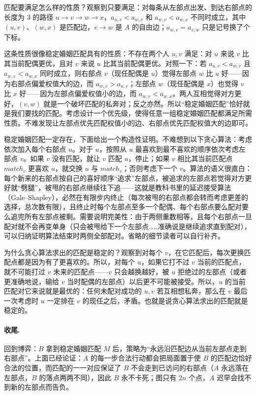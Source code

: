 匹配要满足怎么样的性质？观察到只要满足：对每条从左部点出发、到达右部点的长度为 $3$ 的路径 $u\to v\to w\to x$，$a_{u,v}<a_{w,v}$ 和 $a_{w,v}<a_{w,x}$ 不同时成立，其中 $(u,v)$、$(w,x)$ 是匹配边，$v\to w$ 是 $A$ 的自由边；$a_{w,v}=a_{v,w}$ 只是记号换了个下标。

这条性质很像稳定婚姻匹配具有的性质：不存在两个人 $u,v$ 满足：对 $u$ 来说 $v$ 比其当前配偶更优，且对 $v$ 来说 $u$ 比其当前配偶更优。对照一下：若 $a_{u,v}<a_{w,v}$ 且 $a_{w,v}<a_{w,x}$ 同时成立，则右部点 $v$（现任配偶是 $u$）觉得左部点 $w$ 比 $u$ 好——因为右部点偏爱权值大的边，而 $a_{w,v}>a_{u,v}$；左部点 $w$（现任配偶是 $x$）也觉得 $v$ 比 $x$ 好——因为左部点偏爱权值小的边，而 $a_{w,v}<a_{w,x}$。两人互相觉得对方更好，$(v,w)$ 就是一个破坏匹配的私奔对；反之亦然。所以“稳定婚姻匹配”恰好就是我们要找的匹配。考虑设计一个优先级，使得任意一组稳定婚姻匹配都满足所需性质。不难发现让左部点优先匹配权值小的边、右部点优先匹配权值大的边即可。

稳定婚姻匹配一定存在，下面给出一个构造性证明。不难想到以下贪心算法：考虑依次加入每个右部点 $u$。对于 $u$，按照从 $u$ 最喜欢到最不喜欢的顺序依次考虑左部点 $v$。如果 $v$ 没有匹配，就让 $v$ 匹配 $u$，停止；如果 $v$ 相比其当前匹配点 $match_v$ 更喜欢 $u$，就交换 $u$ 与 $match_v$；否则考虑下一个 $v$。算法的语义很直白：每个新来的右部点按自己的喜好顺序“追求”左部点，被追求的左部点若觉得对方更好就“劈腿”，被甩的右部点继续往下追——这就是教科书里的延迟接受算法（Gale--Shapley），必然在有限步内终止（每次被甩的右部点都会转而考虑更差的选择，总次数有限），且终止时每个左部点至多一个配偶、每个右部点要么配对要么追完所有左部点被剩。需要说明完美性：由于两侧重数相等，且每个右部点一旦配对就不会再变单身（只会被甩给下一个左部点……准确说是继续追求直到配对），可以归纳证明算法结束时两侧全部配对。省略的细节读者可以自行补齐。

为什么贪心算法求出的匹配是稳定的？观察到对每个 $v$，在它匹配后，每次更换匹配点都是因为有了更喜欢的。所以，对每个 $u$，如果它打不过 $v$ 当前的匹配点，就不可能打过 $v$ 未来的匹配点——$v$ 只会越换越好，被 $u$ 拒绝过的左部点（或者更准确地说，输给 $v$ 当时配偶的左部点）以后更不可能被接受。所以，$u$ 的当前匹配对它来说就是最优的：任何未配对成功的 $u,v$ 若互相想私奔，那么在 $v$ 最后一次考虑时 $u$ 一定排在 $v$ 的现任之后，矛盾。也就是说贪心算法求出的匹配就是稳定的。

\paragraph{收尾.} 回到博弈：$B$ 拿到稳定婚姻匹配 $M$ 后，策略为“永远沿匹配边从当前左部点走到右部点”。上面已经论证：$A$ 的每一步合法行动都会把局面置于使 $B$ 的匹配边恰好合法的位置，而匹配的一一对应保证了 $B$ 不会走到已访问的右部点（$A$ 永远落在左部点，$B$ 的落点两两不同），因此 $B$ 永不卡死；图只有 $2n$ 个点，$A$ 迟早会找不到新的左部点而告负。

